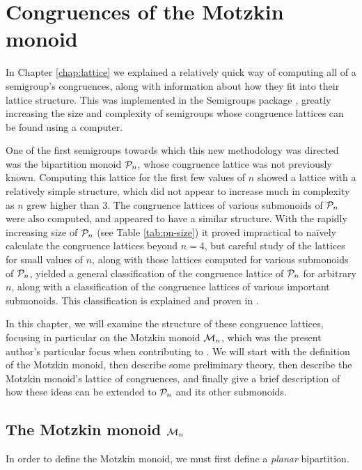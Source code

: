 \chapter{Congruences of the Motzkin monoid}
\label{chap:motzkin}

In Chapter \ref{chap:lattice} we explained a relatively quick way of computing
all of a semigroup's congruences, along with information about how they fit into
their lattice structure.  This was implemented in the Semigroups package
\cite{semigroups}, greatly increasing the size and complexity of semigroups
whose congruence lattices can be found using a computer.

One of the first semigroups towards which this new methodology was directed was
the bipartition monoid $\mathcal{P}_n$, whose congruence lattice was not previously
known.  Computing this lattice for the first few values of $n$ showed a lattice
with a relatively simple structure, which did not appear to increase much in
complexity as $n$ grew higher than $3$.  The congruence lattices of various
submonoids of $\mathcal{P}_n$ were also computed, and appeared to have a similar
structure.  With the rapidly increasing size of $\mathcal{P}_n$ (see Table
\ref{tab:pn-size}) it proved impractical to na\"ively calculate the congruence
lattices beyond $n=4$, but careful study of the lattices for small values of
$n$, along with those lattices computed for various submonoids of $\mathcal{P}_n$,
yielded a general classification of the congruence lattice of $\mathcal{P}_n$ for
arbitrary $n$, along with a classification of the congruence lattices of various
important submonoids.  This classification is explained and proven in
\cite{ourpaper}.

In this chapter, we will examine the structure of these congruence lattices,
focusing in particular on the Motzkin monoid $\mathcal{M}_n$, which was the present
author's particular focus when contributing to \cite{ourpaper}.  We will start
with the definition of the Motzkin monoid, then describe some preliminary
theory, then describe the Motzkin monoid's lattice of congruences, and
finally give a brief description of how these ideas can be extended to $\mathcal{P}_n$
and its other submonoids.

\section{The Motzkin monoid $\mathcal{M}_n$}
\label{sec:motzkin-monoid}
In order to define the Motzkin monoid, we must first define a \textit{planar}
bipartition.

